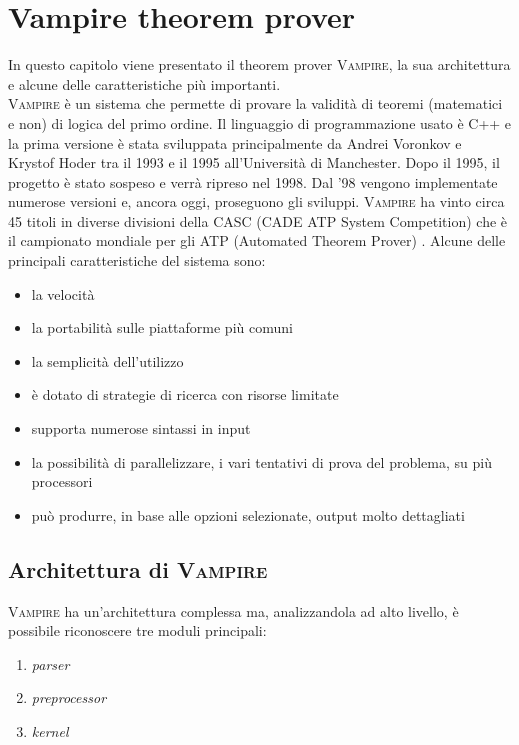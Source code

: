 \chapter{Vampire theorem prover}
In questo capitolo viene presentato il theorem prover \textsc{Vampire}, la sua architettura e alcune
delle caratteristiche più importanti.\\
\textsc{Vampire} è un sistema che permette di provare la validità di teoremi (matematici e non) di logica del primo ordine. 
Il linguaggio di programmazione usato è C++ e la prima versione è stata sviluppata principalmente 
da Andrei Voronkov e Krystof Hoder tra il 1993 e il 1995 all'Università di Manchester. Dopo il 1995, 
il progetto è stato sospeso e verrà ripreso nel 1998. Dal '98 vengono implementate numerose versioni e, 
ancora oggi, proseguono gli sviluppi. \textsc{Vampire} ha vinto circa 45 titoli in diverse divisioni 
della CASC (CADE ATP System Competition) che è il campionato mondiale per gli ATP (Automated Theorem Prover) \cite{kovacs2013first,riazanov2002design}.
Alcune delle principali caratteristiche del sistema sono:
\begin{itemize}
    \item la velocità
    \item la portabilità sulle piattaforme più comuni
    \item la semplicità dell'utilizzo
    \item è dotato di strategie di ricerca con risorse limitate
    \item supporta numerose sintassi in input
    \item la possibilità di parallelizzare, i vari tentativi di prova del problema, su più processori
    \item può produrre, in base alle opzioni selezionate, output molto dettagliati 
\end{itemize}
\section{Architettura di \textsc{Vampire}}
\textsc{Vampire} ha un'architettura complessa ma, analizzandola ad alto livello, è possibile riconoscere tre moduli 
principali:
\begin{enumerate}
    \item \emph{parser}
    \item \emph{preprocessor}
    \item \emph{kernel}
\end{enumerate}
\begin{figure}[H]
\end{figure}


